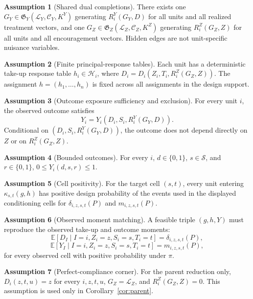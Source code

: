 \documentclass[11pt]{article}
\newcommand{\E}{\mathbb{E}}
\newcommand{\calH}{\mathcal{H}}
\theoremstyle{definition}
\newtheorem{assumption}{Assumption}
\theoremstyle{plain}
\theoremstyle{remark}
\begin{document}
\begin{assumption}[Shared dual completions]\label{ass:dual-completion}
There exists one \(G_Y\in\mathfrak G_Y(\mathcal L_Y,\mathcal C_Y,K^Y)\) generating \(R_i^Y(G_Y,D)\) for all units and all realized treatment vectors, and one \(G_Z\in\mathfrak G_Z(\mathcal L_Z,\mathcal C_Z,K^Z)\) generating \(R_i^Z(G_Z,Z)\) for all units and all encouragement vectors. Hidden edges are not unit-specific nuisance variables.
\end{assumption}

\begin{assumption}[Finite principal-response tables]\label{ass:principal}
Each unit has a deterministic take-up response table \(h_i\in\calH_i\), where \(D_i=D_i(Z_i,T_i,R_i^Z(G_Z,Z))\). The assignment \(h=(h_1,\ldots,h_n)\) is fixed across all assignments in the design support.
\end{assumption}

\begin{assumption}[Outcome exposure sufficiency and exclusion]\label{ass:outcome}
For every unit \(i\), the observed outcome satisfies
\[
Y_i=Y_i(D_i,S_i,R_i^Y(G_Y,D)).
\]
Conditional on \((D_i,S_i,R_i^Y(G_Y,D))\), the outcome does not depend directly on \(Z\) or on \(R_i^Z(G_Z,Z)\).
\end{assumption}

\begin{assumption}[Bounded outcomes]\label{ass:bounded}
For every \(i\), \(d\in\{0,1\}\), \(s\in\mathcal S\), and \(r\in\{0,1\}\), \(0\le Y_i(d,s,r)\le 1\).
\end{assumption}

\begin{assumption}[Cell positivity]\label{ass:positivity}
For the target cell \((s,t)\), every unit entering \(\kappa_{s,t}(g,h)\) has positive design probability of the events used in the displayed conditioning cells for \(\delta_{i,z,s,t}(P)\) and \(m_{i,z,s,t}(P)\).
\end{assumption}

\begin{assumption}[Observed moment matching]\label{ass:matching}
A feasible triple \((g,h,Y)\) must reproduce the observed take-up and outcome moments:
\[
\E[D_I\mid I=i,Z_i=z,S_i=s,T_i=t]=\delta_{i,z,s,t}(P),
\]
\[
\E[Y_I\mid I=i,Z_i=z,S_i=s,T_i=t]=m_{i,z,s,t}(P),
\]
for every observed cell with positive probability under \(\pi\).
\end{assumption}

\begin{assumption}[Perfect-compliance corner]\label{ass:parent-corner}
For the parent reduction only, \(D_i(z,t,u)=z\) for every \(i,z,t,u\), \(G_Z=\mathcal L_Z\), and \(R_i^Z(G_Z,Z)=0\). This assumption is used only in Corollary~\ref{cor:parent}.
\end{assumption}
\end{document}
